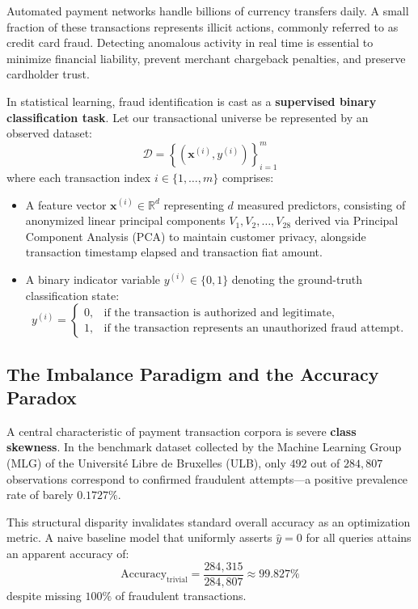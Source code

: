 \documentclass[11pt,a4paper]{article}
\begin{document}
Automated payment networks handle billions of currency transfers daily. A small fraction of these transactions represents illicit actions, commonly referred to as credit card fraud. Detecting anomalous activity in real time is essential to minimize financial liability, prevent merchant chargeback penalties, and preserve cardholder trust.

In statistical learning, fraud identification is cast as a \textbf{supervised binary classification task}. Let our transactional universe be represented by an observed dataset:
\begin{equation}
    \mathcal{D} = \left\{ \left(\mathbf{x}^{(i)}, y^{(i)}\right) \right\}_{i=1}^m
\end{equation}
where each transaction index $i \in \{1, \dots, m\}$ comprises:
\begin{itemize}
    \item A feature vector $\mathbf{x}^{(i)} \in \mathbb{R}^d$ representing $d$ measured predictors, consisting of anonymized linear principal components $V_1, V_2, \dots, V_{28}$ derived via Principal Component Analysis (PCA) to maintain customer privacy, alongside transaction timestamp elapsed and transaction fiat amount.
    \item A binary indicator variable $y^{(i)} \in \{0, 1\}$ denoting the ground-truth classification state:
    \begin{equation}
        y^{(i)} = \begin{cases}
            0, & \text{if the transaction is authorized and legitimate}, \\
            1, & \text{if the transaction represents an unauthorized fraud attempt}.
        \end{cases}
    \end{equation}
\end{itemize}

\subsection{The Imbalance Paradigm and the Accuracy Paradox}
A central characteristic of payment transaction corpora is severe \textbf{class skewness}. In the benchmark dataset collected by the Machine Learning Group (MLG) of the Université Libre de Bruxelles (ULB), only $492$ out of $284,807$ observations correspond to confirmed fraudulent attempts---a positive prevalence rate of barely $0.1727\%$. 

This structural disparity invalidates standard overall accuracy as an optimization metric. A naive baseline model that uniformly asserts $\hat{y} = 0$ for all queries attains an apparent accuracy of:
\begin{equation}
    \text{Accuracy}_{\text{trivial}} = \frac{284,315}{284,807} \approx 99.827\%
\end{equation}
despite missing $100\%$ of fraudulent transactions. 
\end{document}
